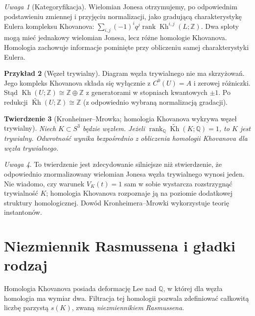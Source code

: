 \documentclass[11pt,a4paper]{report}
\numberwithin{equation}{section}
\theoremstyle{plain}
\newtheorem{twierdzenie}{Twierdzenie}[section]
\theoremstyle{definition}
\newtheorem{przyklad}[twierdzenie]{Przykład}
\theoremstyle{remark}
\newtheorem{uwaga}[twierdzenie]{Uwaga}
\begin{document}
\begin{uwaga}[Kategoryfikacja]
Wielomian Jonesa otrzymujemy, po odpowiednim podstawieniu
zmiennej i przyjęciu normalizacji, jako gradującą
charakterystykę Eulera kompleksu Khovanova:
$\sum_{i,j}(-1)^i q^j\operatorname{rank}
\operatorname{Kh}^{i,j}(L;\mathbb Z)$.
Dwa sploty mogą mieć jednakowy wielomian Jonesa, lecz
różne homologie Khovanova. Homologia zachowuje informacje
pominięte przy obliczeniu samej charakterystyki Eulera.
\end{uwaga}

\begin{przyklad}[Węzeł trywialny]
Diagram węzła trywialnego nie ma skrzyżowań.
Jego kompleks Khovanova składa się wyłącznie z
$C^0(U)=A$ i zerowej różniczki. Stąd
$\operatorname{Kh}(U;\mathbb Z)\cong\mathbb Z\oplus\mathbb Z$
z generatorami w stopniach kwantowych $\pm1$.
Po redukcji $\widetilde{\operatorname{Kh}}(U;\mathbb Z)
\cong\mathbb Z$ (z odpowiednio wybraną normalizacją gradacji).
\end{przyklad}

\begin{twierdzenie}[Kronheimer--Mrowka; homologia Khovanova wykrywa węzeł trywialny]
Niech $K\subset S^3$ będzie węzłem. Jeżeli
$\operatorname{rank}_{\mathbb Q}
\widetilde{\operatorname{Kh}}(K;\mathbb Q)=1$,
to $K$ jest trywialny. Odwrotność wynika bezpośrednio
z obliczenia homologii Khovanova dla węzła trywialnego.
\end{twierdzenie}

\begin{uwaga}
To twierdzenie jest zdecydowanie silniejsze niż
stwierdzenie, że odpowiednio znormalizowany wielomian
Jonesa węzła trywialnego wynosi jeden. Nie wiadomo,
czy warunek $V_K(t)=1$ sam w sobie wystarcza
rozstrzygnąć trywialność $K$; homologia Khovanova
rozpoznaje ją na poziomie dodatkowej struktury homologicznej.
Dowód Kronheimera--Mrowki wykorzystuje teorię instantonów.
\end{uwaga}

\section{Niezmiennik Rasmussena i gładki rodzaj}
\label{sec:kt-rasmussen}

Homologia Khovanova posiada deformację Lee nad $\mathbb Q$,
w której dla węzła homologia ma wymiar dwa. Filtracja
tej homologii pozwala zdefiniować całkowitą liczbę parzystą
$s(K)$, zwaną \emph{niezmiennikiem Rasmussena}.
\end{document}

